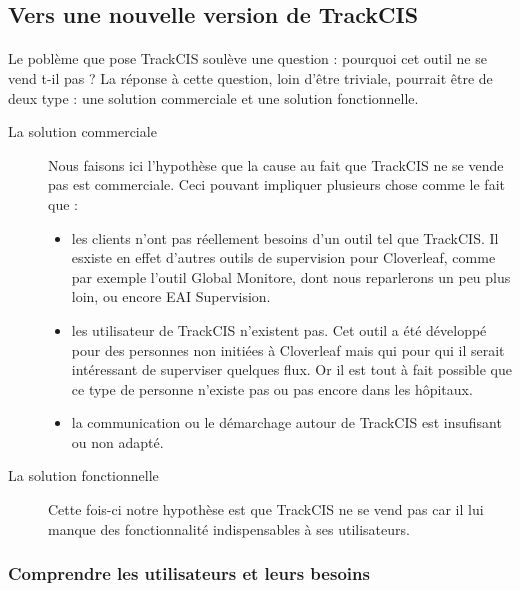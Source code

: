 	\subsection{Vers une nouvelle version de TrackCIS}
		\paragraph{}%
		Le poblème que pose TrackCIS soulève une question : pourquoi cet outil ne se
		vend t-il pas ? La réponse à cette question, loin d'être triviale, pourrait
		être de deux type : une solution commerciale et une solution fonctionnelle.
		\begin{description}
			\item[La solution commerciale] Nous faisons ici l'hypothèse que la cause au
			fait que TrackCIS ne se vende pas est commerciale. Ceci pouvant impliquer
			plusieurs chose comme le fait que :
			\begin{itemize}
			  \item les clients n'ont pas réellement besoins d'un outil tel que TrackCIS.
			  Il esxiste en effet d'autres outils de supervision pour Cloverleaf, comme
			  par exemple l'outil Global Monitore, dont nous reparlerons un peu plus
			  loin, ou encore EAI Supervision.
			  \item les utilisateur de TrackCIS n'existent pas. Cet outil a été développé
			  pour des personnes non initiées à Cloverleaf mais qui pour qui il serait
			  intéressant de superviser quelques flux.
			  Or il est tout à fait possible que ce type de personne n'existe pas ou pas
			  encore dans les hôpitaux.
			  \item la communication ou le démarchage autour de TrackCIS est insufisant
			  ou non adapté.
			\end{itemize}
			\item[La solution fonctionnelle] Cette fois-ci notre hypothèse est que
			TrackCIS ne se vend pas car il lui manque des fonctionnalité indispensables à
			ses utilisateurs.
		\end{description}
		
		\subsubsection{Comprendre les utilisateurs et leurs besoins}
			\paragraph{}%
			
